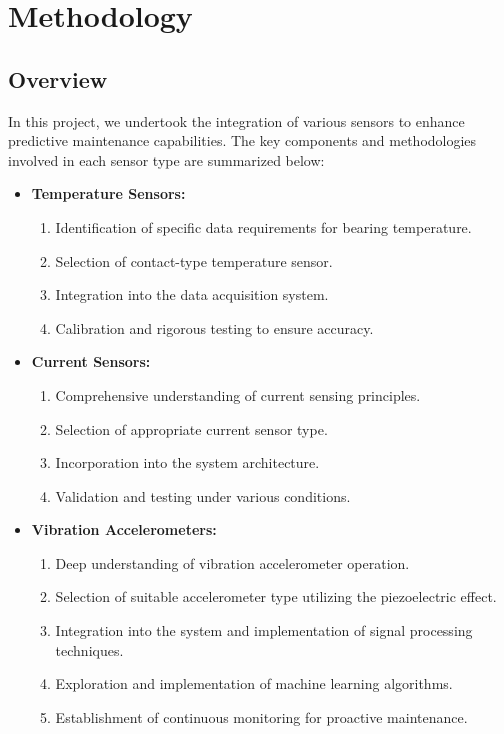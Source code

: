 \section{Methodology}

\subsection{Overview}

In this project, we undertook the integration of various sensors to enhance predictive maintenance capabilities. The key components and methodologies involved in each sensor type are summarized below:

\begin{itemize}
  \item \textbf{Temperature Sensors:}
    \begin{enumerate}
      \item Identification of specific data requirements for bearing temperature.
      \item Selection of contact-type temperature sensor.
      \item Integration into the data acquisition system.
      \item Calibration and rigorous testing to ensure accuracy.
    \end{enumerate}

  \item \textbf{Current Sensors:}
    \begin{enumerate}
      \item Comprehensive understanding of current sensing principles.
      \item Selection of appropriate current sensor type.
      \item Incorporation into the system architecture.
      \item Validation and testing under various conditions.
    \end{enumerate}

  \item \textbf{Vibration Accelerometers:}
    \begin{enumerate}
      \item Deep understanding of vibration accelerometer operation.
      \item Selection of suitable accelerometer type utilizing the piezoelectric effect.
      \item Integration into the system and implementation of signal processing techniques.
      \item Exploration and implementation of machine learning algorithms.
      \item Establishment of continuous monitoring for proactive maintenance.
    \end{enumerate}
\end{itemize}

